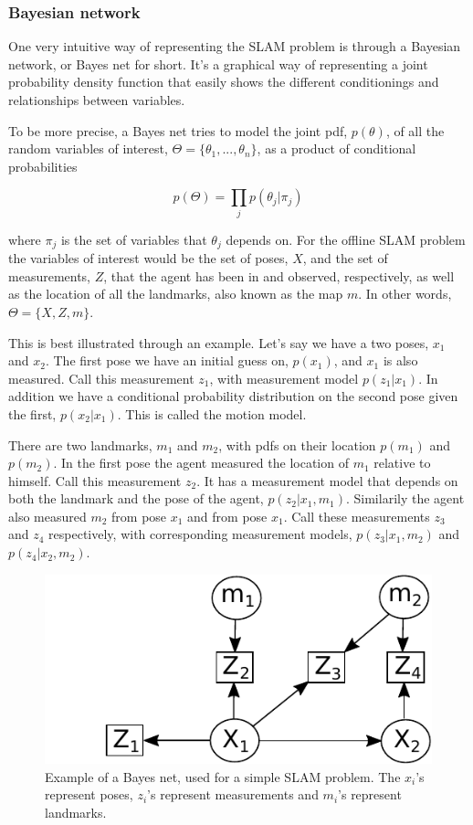 \subsubsection{Bayesian network}

One very intuitive way of representing the SLAM problem is through a Bayesian network, or Bayes net for short. It's a graphical way of representing a joint probability density function that easily shows the different conditionings and relationships between variables. 

To be more precise, a Bayes net tries to model the joint pdf, $p(\theta)$, of all the random variables of interest, $\Theta = \{\theta_1, ..., \theta_n\}$, as a product of conditional probabilities

\begin{equation}
    p(\Theta) = \prod_j p(\theta_j|\pi_j)
\end{equation}

where $\pi_j$ is the set of variables that $\theta_j$ depends on. For the offline SLAM problem the variables of interest would be the set of poses, $X$, and the set of measurements, $Z$, that the agent has been in and observed, respectively, as well as the location of all the landmarks, also known as the map $m$. In other words, $\Theta = \{X,Z,m\}$. 

This is best illustrated through an example. Let's say we have a two poses, $x_1$ and $x_2$. The first pose we have an initial guess on, $p(x_1)$, and $x_1$ is also measured. Call this measurement $z_1$, with measurement model $p(z_1|x_1)$. In addition we have a conditional probability distribution on the second pose given the first, $p(x_2|x_1)$. This is called the motion model. 

There are two landmarks, $m_1$ and $m_2$, with pdfs on their location $p(m_1)$ and $p(m_2)$. In the first pose the agent measured the location of $m_1$ relative to himself. Call this measurement $z_2$. It has a measurement model that depends on both the landmark and the pose of the agent, $p(z_2|x_1,m_1)$. Similarily the agent also measured $m_2$ from pose $x_1$ and from pose $x_1$. Call these measurements $z_3$ and $z_4$ respectively, with corresponding measurement models, $p(z_3|x_1,m_2)$ and $p(z_4|x_2,m_2)$. 

\begin{figure}
    \centering
    \includegraphics[width=0.8\linewidth]{0_Images/3_Background/BayesNet.pdf}
    \caption[Example of a Bayes net.]
    {Example of a Bayes net, used for a simple SLAM problem. The $x_i$'s represent poses, $z_i$'s represent measurements and $m_i$'s represent landmarks.}
    \label{Fig:BayesNet}
\end{figure}

